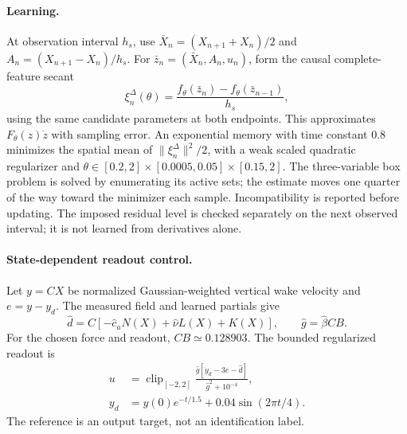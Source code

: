 \paragraph{Learning.}
At observation interval $h_s$, use
$\bar X_n=(X_{n+1}+X_n)/2$ and $A_n=(X_{n+1}-X_n)/h_s$.
For $\bar z_n=(\bar X_n,A_n,u_n)$, form the causal complete-feature secant
\begin{equation}
 \xi_n^\Delta(\theta)=
 \frac{f_\theta(\bar z_n)-f_\theta(\bar z_{n-1})}{h_s},
 \label{eq:afc_short_secant}
\end{equation}
using the same candidate parameters at both endpoints. This approximates
$F_\theta(z)\dot z$ with sampling error. An exponential memory with time
constant $0.8$ minimizes the spatial mean of
$\|\xi_n^\Delta\|^2/2$, with a weak scaled quadratic regularizer and
$\theta\in[0.2,2]\times[0.0005,0.05]\times[0.15,2]$.
The three-variable box problem is solved by enumerating its active sets;
the estimate moves one quarter of the way toward the minimizer each sample.
Incompatibility is reported before updating. The imposed residual level is
checked separately on the next observed interval; it is not learned from
derivatives alone.

\paragraph{State-dependent readout control.}
Let $y=CX$ be normalized Gaussian-weighted vertical wake velocity and
$e=y-y_d$. The measured field and learned partials give
\begin{equation}
 \hat d=C[-\hat c_aN(X)+\hat\nu L(X)+K(X)],
 \qquad \hat g=\hat\beta CB.
\end{equation}
For the chosen force and readout, $CB\simeq0.128903$. The bounded regularized
readout is
\begin{align}
 u&=\operatorname{clip}_{[-2,2]}
 \frac{\hat g[\dot y_d-3e-\hat d]}{\hat g^2+10^{-4}},
 \label{eq:afc_short_control}
 \\
 y_d&=y(0)e^{-t/1.5}+0.04\sin(2\pi t/4).\nonumber
\end{align}
The reference is an output target, not an identification label.

